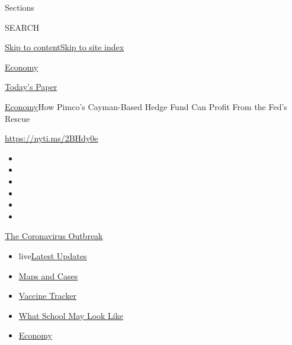Sections

SEARCH

\protect\hyperlink{site-content}{Skip to
content}\protect\hyperlink{site-index}{Skip to site index}

\href{https://www.nytimes3xbfgragh.onion/section/business/economy}{Economy}

\href{https://myaccount.nytimes3xbfgragh.onion/auth/login?response_type=cookie\&client_id=vi}{}

\href{https://www.nytimes3xbfgragh.onion/section/todayspaper}{Today's
Paper}

\href{/section/business/economy}{Economy}\textbar{}How Pimco's
Cayman-Based Hedge Fund Can Profit From the Fed's Rescue

\url{https://nyti.ms/2BHdy0e}

\begin{itemize}
\item
\item
\item
\item
\item
\item
\end{itemize}

\href{https://www.nytimes3xbfgragh.onion/news-event/coronavirus?action=click\&pgtype=Article\&state=default\&region=TOP_BANNER\&context=storylines_menu}{The
Coronavirus Outbreak}

\begin{itemize}
\tightlist
\item
  live\href{https://www.nytimes3xbfgragh.onion/2020/08/01/world/coronavirus-covid-19.html?action=click\&pgtype=Article\&state=default\&region=TOP_BANNER\&context=storylines_menu}{Latest
  Updates}
\item
  \href{https://www.nytimes3xbfgragh.onion/interactive/2020/us/coronavirus-us-cases.html?action=click\&pgtype=Article\&state=default\&region=TOP_BANNER\&context=storylines_menu}{Maps
  and Cases}
\item
  \href{https://www.nytimes3xbfgragh.onion/interactive/2020/science/coronavirus-vaccine-tracker.html?action=click\&pgtype=Article\&state=default\&region=TOP_BANNER\&context=storylines_menu}{Vaccine
  Tracker}
\item
  \href{https://www.nytimes3xbfgragh.onion/interactive/2020/07/29/us/schools-reopening-coronavirus.html?action=click\&pgtype=Article\&state=default\&region=TOP_BANNER\&context=storylines_menu}{What
  School May Look Like}
\item
  \href{https://www.nytimes3xbfgragh.onion/live/2020/07/31/business/stock-market-today-coronavirus?action=click\&pgtype=Article\&state=default\&region=TOP_BANNER\&context=storylines_menu}{Economy}
\end{itemize}

